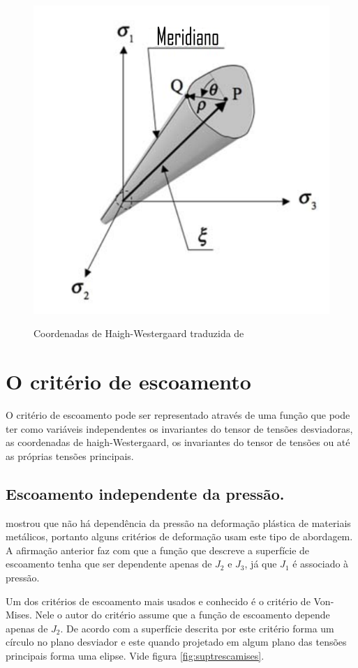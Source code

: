 \begin{figure}[H]
    \centering
    \caption{Coordenadas de Haigh-Westergaard traduzida de \cite{hiermaier_2008}}
    \includegraphics[width=0.5\linewidth]{images/Haigh_Wester.png}
    \label{fig:coordhaigh}
\end{figure}

\section{O critério de escoamento}

O critério de escoamento pode ser representado através de uma função que pode ter como variáveis independentes os invariantes do tensor de tensões desviadoras, as coordenadas de haigh-Westergaard, os invariantes do tensor de tensões ou até as próprias tensões principais. \\

\subsection{Escoamento independente da pressão.}

 \cite{hill} mostrou que não há dependência da pressão na deformação plástica de materiais metálicos, portanto alguns critérios de deformação usam este tipo de abordagem. A afirmação anterior faz com que a função que descreve a superfície de escoamento tenha que ser dependente apenas de $J_2$ e $J_3$, já que $J_1$ é associado à pressão.

Um dos critérios de escoamento mais usados e conhecido é o critério de Von-Mises. Nele o autor do critério assume que a função de escoamento depende apenas de $ J_2 $. De acordo com \cite{hiermaier_2008} a superfície descrita por este critério forma um círculo no plano desviador e este quando projetado em algum plano das tensões principais forma uma elipse. Vide figura \ref{fig:suptrescamises}.

